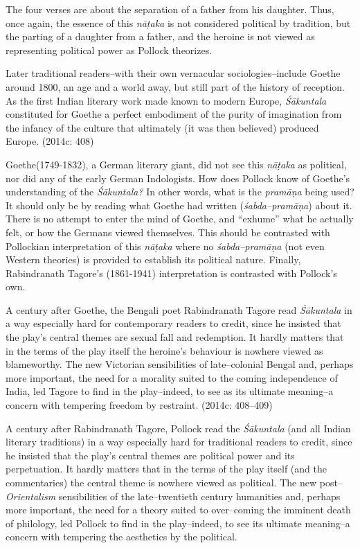 The four verses are about the separation of a father from his daughter. Thus, once again, the essence of this \textit{nāṭaka }is not considered political by tradition, but the parting of a daughter from a father, and the heroine is not viewed as representing political power as Pollock theorizes.

\begin{myquote}
Later traditional readers–with their own vernacular sociologies–include Goethe around 1800, an age and a world away, but still part of the history of reception. As the first Indian literary work made known to modern Europe, \textit{Śākuntala} constituted for Goethe a perfect embodiment of the purity of imagination from the infancy of the culture that ultimately (it was then believed) produced Europe. (2014c: 408)
\end{myquote}

Goethe(1749-1832), a German literary giant, did not see this \textit{nāṭaka }as political, nor did any of the early German Indologists. How does Pollock know of Goethe’s understanding of the \textit{Śākuntala?} In other words, what is the \textit{pramāṇa} being used? It should only be by reading what Goethe had written (\textit{śabda–pramāṇa}) about it. There is no attempt to enter the mind of Goethe, and “exhume” what he actually felt, or how the Germans viewed themselves. This should be contrasted with Pollockian interpretation of this \textit{nāṭaka} where no \textit{śabda–pramāṇa }(not even Western theories) is provided to establish its political nature. Finally, Rabindranath Tagore’s (1861-1941) interpretation is contrasted with Pollock’s own.

\begin{myquote}
A century after Goethe, the Bengali poet Rabindranath Tagore read \textit{Śākuntala} in a way especially hard for contemporary readers to credit, since he insisted that the play’s central themes are sexual fall and redemption. It hardly matters that in the terms of the play itself the heroine’s behaviour is nowhere viewed as blameworthy. The new Victorian sensibilities of late–colonial Bengal and, perhaps more important, the need for a morality suited to the coming independence of India, led Tagore to find in the play–indeed, to see as its ultimate meaning–a concern with tempering freedom by restraint. (2014c: 408–409)
\end{myquote}

A century after Rabindranath Tagore, Pollock read the \textit{Śākuntala} (and all Indian literary traditions) in a way especially hard for traditional readers to credit, since he insisted that the play’s central themes are political power and its perpetuation. It hardly matters that in the terms of the play itself (and the commentaries) the central theme is nowhere viewed as political. The new post–\textit{Orientalism} sensibilities of the late–twentieth century humanities and, perhaps more important, the need for a theory suited to over–coming the imminent death of philology, led Pollock to find in the play–indeed, to see its ultimate meaning–a concern with tempering the aesthetics by the political.

